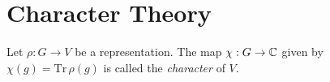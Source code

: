
            



\section{Character Theory}










\begin{definition}
    Let $\rho : G \rightarrow V$ be a representation. The map $\chi : G \rightarrow \mathbb{C}$ given by $\chi(g) = 
    \text{Tr}\,\rho(g)$ is called the \emph{character} of $V$.
\end{definition}

